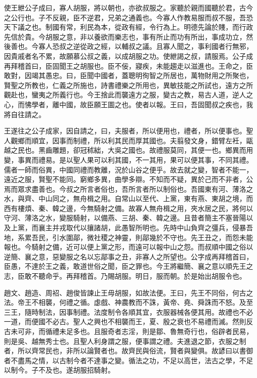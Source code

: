 使王紲公子成曰，寡人胡服，將以朝也，亦欲叔服之。家聽於親而國聽於君，古今之公行也。子不反親，臣不逆君，兄弟之通義也。今寡人作教易服而叔不服，吾恐天下議之也。制國有常，利民為本，從政有經，令行為上。明德先論於賤，而行政先信於貴。今胡服之意，非以養欲而樂志也，事有所止而功有所出，事成功立，然後善也。今寡人恐叔之逆從政之經，以輔叔之議。且寡人聞之，事利國者行無邪，因貴戚者名不累，故願慕公叔之義，以成胡服之功。使紲謁之叔，請服焉。公子成再拜稽首曰，臣固聞王之胡服也。臣不佞，寢疾，未能趨走以滋進也。王命之，臣敢對，因竭其愚忠。曰，臣聞中國者，蓋聰明徇智之所居也，萬物財用之所聚也，賢聖之所教也，仁義之所施也，詩書禮樂之所用也，異敏技能之所試也，遠方之所觀赴也，蠻夷之所義行也。今王捨此而襲遠方之服，變古之教，易古人道，逆人之心，而怫學者，離中國，故臣願王圖之也。使者以報。王曰，吾固聞叔之疾也，我將自往請之。

王遂往之公子成家，因自請之，曰，夫服者，所以便用也，禮者，所以便事也。聖人觀鄉而順宜，因事而制禮，所以利其民而厚其國也。夫翦發文身，錯臂左衽，甌越之民也。黑齒雕題，卻冠秫絀，大吳之國也。故禮服莫同，其便一也。鄉異而用變，事異而禮易。是以聖人果可以利其國，不一其用，果可以便其事，不同其禮。儒者一師而俗異，中國同禮而教離，況於山谷之便乎。故去就之變，智者不能一，遠近之服，賢聖不能同。窮鄉多異，曲學多辯。不知而不疑，異於己而不非者，公焉而眾求盡善也。今叔之所言者俗也，吾所言者所以制俗也。吾國東有河、薄洛之水，與齊、中山同之，無舟楫之用。自常山以至代、上黨，東有燕、東胡之境，而西有樓煩、秦、韓之邊，今無騎射之備。故寡人無舟楫之用，夾水居之民，將何以守河、薄洛之水，變服騎射，以備燕、三胡、秦、韓之邊。且昔者簡主不塞晉陽以及上黨，而襄主并戎取代以攘諸胡，此愚智所明也。先時中山負齊之彊兵，侵暴吾地，系累吾民，引水圍鄗，微社稷之神靈，則鄗幾於不守也。先王丑之，而怨未能報也。今騎射之備，近可以便上黨之形，而遠可以報中山之怨。而叔順中國之俗以逆簡、襄之意，惡變服之名以忘鄗事之丑，非寡人之所望也。公字成再拜稽首曰，臣愚，不達於王之義，敢道世俗之聞，臣之罪也。今王將繼簡、襄之意以順先王之志，臣敢不聽命乎。再拜稽首。乃賜胡服。明日，服而朝。於是始出胡服令也。

趙文、趙造、周袑、趙俊皆諫止王毋胡服，如故法便。王曰，先王不同俗，何古之法。帝王不相襲，何禮之循。虙戲、神農教而不誅，黃帝、堯、舜誅而不怒。及至三王，隨時制法，因事制禮。法度制令各順其宜，衣服器械各便其用。故禮也不必一道，而便國不必古。聖人之興也不相襲而王，夏、殷之衰也不易禮而滅。然則反古未可非，而循禮未足多也。且服奇者志淫，則是鄒、魯無奇行也，俗辟者民易，則是吳、越無秀士也。且聖人利身謂之服，便事謂之禮。夫進退之節，衣服之制者，所以齊常民也，非所以論賢者也。故齊民與俗流，賢者與變俱。故諺曰以書御者不盡馬之情，以古制今者不達事之變。循法之功，不足以高世，法古之學，不足以制今。子不及也。遂胡服招騎射。

